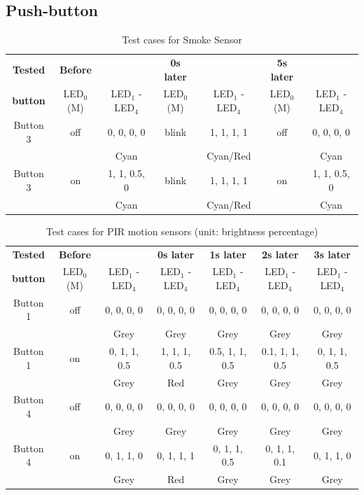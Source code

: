 {\subsection{Push-button}

\begin{table}[H]
\begin{tabular}{c|c c|c c|c c}
\textbf{Tested} &\textbf{Before} & & \textbf{0s later}& &\textbf{5s later}& \\
 \textbf{button} & LED$_0$(M) & LED$_1$ - LED$_4$ & LED$_0$(M)&LED$_1$ - LED$_4$ & LED$_0$(M)&LED$_1$ - LED$_4$ \\\hline
 Button 3 & off & 0, 0, 0, 0 &blink& 1, 1, 1, 1  &off& 0, 0, 0, 0 \\
  &   & Cyan && Cyan/Red && Cyan  \\ \hline
  Button 3 & on & 1, 1, 0.5, 0 &blink& 1, 1, 1, 1 &on& 1, 1, 0.5, 0 \\
  &   & Cyan && Cyan/Red && Cyan  \\ \hline
\end{tabular}
\caption{\label{tab:alarm}Test cases for Smoke Sensor }
\end{table}

\begin{table}[H]
\begin{tabular}{c|c c| c|c|c|c}
\textbf{Tested} &\textbf{Before} & & \textbf{0s later}& \textbf{1s later}& \textbf{2s later} & \textbf{3s later} \\
 \textbf{button} & LED$_0$(M) & LED$_1$ - LED$_4$ & LED$_1$ - LED$_4$ & LED$_1$ - LED$_4$ & LED$_1$ - LED$_4$ & LED$_1$ - LED$_4$ \\\hline
 Button 1 & off & 0, 0, 0, 0 & 0, 0, 0, 0 & 0, 0, 0, 0 & 0, 0, 0, 0 & 0, 0, 0, 0 \\
  &   & Grey & Grey &Grey & Grey & Grey \\ \hline
 Button 1 & on & 0, 1, 1, 0.5 & 1, 1, 1, 0.5 & 0.5, 1, 1, 0.5 & 0.1, 1, 1, 0.5 & 0, 1, 1, 0.5 \\
 &   & Grey & Red &Grey & Grey & Grey \\
\hline
Button 4 & off & 0, 0, 0, 0 & 0, 0, 0, 0 & 0, 0, 0, 0 & 0, 0, 0, 0 & 0, 0, 0, 0 \\
  &   & Grey & Grey &Grey & Grey & Grey \\ \hline
 Button 4 & on & 0, 1, 1, 0 & 0, 1, 1, 1 & 0, 1, 1, 0.5 & 0, 1, 1, 0.1 & 0, 1, 1, 0 \\
 &   & Grey & Red &Grey & Grey & Grey \\
\hline
\end{tabular}
\caption{\label{tab:sensor}Test cases for PIR motion sensors (unit: brightness percentage)}
\end{table}

}
